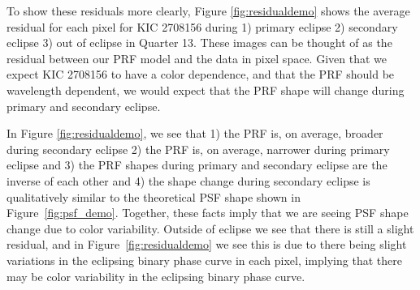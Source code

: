 \documentclass[iop]{emulateapj}
\newcommand{\kepler}{\emph{Kepler}\xspace}
\newcommand{\target}{KIC 2708156\xspace}
\begin{document}





To show these residuals more clearly, Figure \ref{fig:residualdemo} shows the average residual for each pixel for \target during 1) primary eclipse 2) secondary eclipse 3) out of eclipse in Quarter 13. These images can be thought of as the residual between our PRF model and the data in pixel space. Given that we expect \target to have a color dependence, and that the PRF should be wavelength dependent, we would expect that the PRF shape will change during primary and secondary eclipse.

In Figure \ref{fig:residualdemo}, we see that 1) the PRF is, on average, broader during secondary eclipse 2) the PRF is, on average, narrower during primary eclipse and 3) the PRF shapes during primary and secondary eclipse are the inverse of each other and 4) the shape change during secondary eclipse is qualitatively similar to the theoretical PSF shape shown in Figure~\ref{fig:psf_demo}. Together, these facts imply that we are seeing PSF shape change due to color variability. Outside of eclipse we see that there is still a slight residual, and in Figure~\ref{fig:residualdemo} we see this is due to there being slight variations in the eclipsing binary phase curve in each pixel, implying that there may be color variability in the eclipsing binary phase curve.
\end{document}
